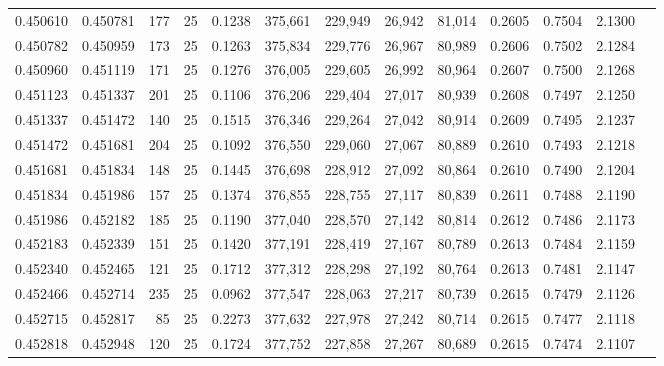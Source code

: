 \begin{tabular}{rrrrrrrrrrrrr}
0.450610 & 0.450781 &   177 &  25 &                                     0.1238 & 375,661 & 229,949 &  26,942 &  81,014 & 0.2605 & 0.7504 & 2.1300 \\
0.450782 & 0.450959 &   173 &  25 &                                     0.1263 & 375,834 & 229,776 &  26,967 &  80,989 & 0.2606 & 0.7502 & 2.1284 \\
0.450960 & 0.451119 &   171 &  25 &                                     0.1276 & 376,005 & 229,605 &  26,992 &  80,964 & 0.2607 & 0.7500 & 2.1268 \\
0.451123 & 0.451337 &   201 &  25 &                                     0.1106 & 376,206 & 229,404 &  27,017 &  80,939 & 0.2608 & 0.7497 & 2.1250 \\
0.451337 & 0.451472 &   140 &  25 &                                     0.1515 & 376,346 & 229,264 &  27,042 &  80,914 & 0.2609 & 0.7495 & 2.1237 \\
0.451472 & 0.451681 &   204 &  25 &                                     0.1092 & 376,550 & 229,060 &  27,067 &  80,889 & 0.2610 & 0.7493 & 2.1218 \\
0.451681 & 0.451834 &   148 &  25 &                                     0.1445 & 376,698 & 228,912 &  27,092 &  80,864 & 0.2610 & 0.7490 & 2.1204 \\
0.451834 & 0.451986 &   157 &  25 &                                     0.1374 & 376,855 & 228,755 &  27,117 &  80,839 & 0.2611 & 0.7488 & 2.1190 \\
0.451986 & 0.452182 &   185 &  25 &                                     0.1190 & 377,040 & 228,570 &  27,142 &  80,814 & 0.2612 & 0.7486 & 2.1173 \\
0.452183 & 0.452339 &   151 &  25 &                                     0.1420 & 377,191 & 228,419 &  27,167 &  80,789 & 0.2613 & 0.7484 & 2.1159 \\
0.452340 & 0.452465 &   121 &  25 &                                     0.1712 & 377,312 & 228,298 &  27,192 &  80,764 & 0.2613 & 0.7481 & 2.1147 \\
0.452466 & 0.452714 &   235 &  25 &                                     0.0962 & 377,547 & 228,063 &  27,217 &  80,739 & 0.2615 & 0.7479 & 2.1126 \\
0.452715 & 0.452817 &    85 &  25 &                                     0.2273 & 377,632 & 227,978 &  27,242 &  80,714 & 0.2615 & 0.7477 & 2.1118 \\
0.452818 & 0.452948 &   120 &  25 &                                     0.1724 & 377,752 & 227,858 &  27,267 &  80,689 & 0.2615 & 0.7474 & 2.1107 \\

\end{tabular}
